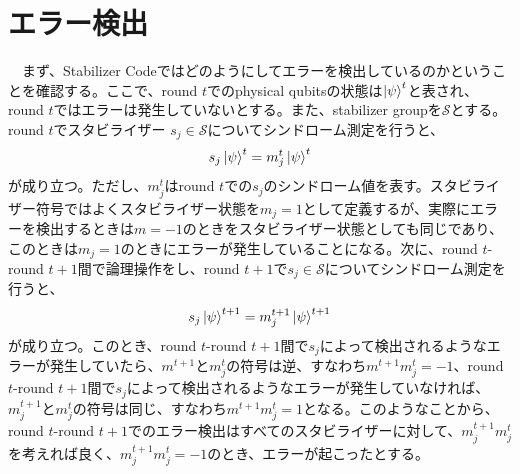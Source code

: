 \documentclass[a4paper,9pt]{ltjsarticle}
\begin{document}
\section{エラー検出}{
    　まず、Stabilizer Codeではどのようにしてエラーを検出しているのかということを確認する。ここで、round $t$でのphysical qubitsの状態は$\ket{\psi}^t$と表され、round $t$ではエラーは発生していないとする。また、stabilizer groupを$\mathcal{S}$とする。round $t$でスタビライザー $s_j\in \mathcal{S}$についてシンドローム測定を行うと、
    \begin{align}
        s_j\ket{\psi}^t=m^{t}_j\ket{\psi}^t
    \end{align}
    が成り立つ。ただし、$m^{t}_j$はround $t$での$s_j$のシンドローム値を表す。スタビライザー符号ではよくスタビライザー状態を$m_j=1$として定義するが、実際にエラーを検出するときは$m=-1$のときをスタビライザー状態としても同じであり、このときは$m_j=1$のときにエラーが発生していることになる。次に、round $t$-round $t+1$間で論理操作をし、round $t+1$で$s_j\in \mathcal{S}$についてシンドローム測定を行うと、
    \begin{align}
        s_j\ket{\psi}^{t+1}=m^{t+1}_j\ket{\psi}^{t+1}
    \end{align}
    が成り立つ。このとき、round $t$-round $t+1$間で$s_j$によって検出されるようなエラーが発生していたら、$m^{t+1}$と$m^{t}_j$の符号は逆、すなわち$m^{t+1}m^{t}_j=-1$、round $t$-round $t+1$間で$s_j$によって検出されるようなエラーが発生していなければ、$m^{t+1}_{j}$と$m^{t}_j$の符号は同じ、すなわち$m^{t+1}m^{t}_j=1$となる。このようなことから、round $t$-round $t+1$でのエラー検出はすべてのスタビライザーに対して、$m^{t+1}_{j}m^{t}_j$を考えれば良く、$m^{t+1}_{j}m^{t}_j=-1$のとき、エラーが起こったとする。
}
\clearpage
\end{document}
